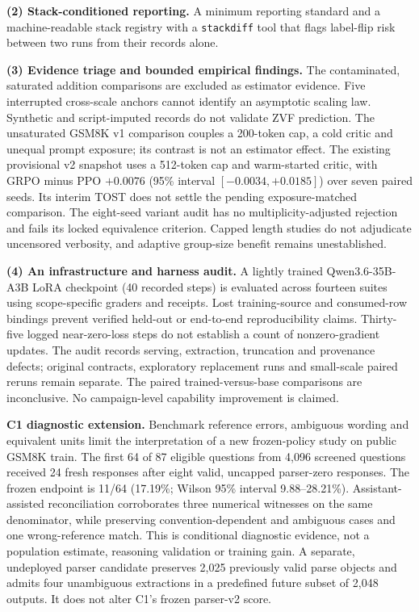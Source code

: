 \documentclass[12pt,a4paper]{report}
\begin{document}
\textbf{(2) Stack-conditioned reporting.} A minimum reporting standard and a
machine-readable stack registry with a \texttt{stackdiff} tool that flags
label-flip risk between two runs from their records alone.

\textbf{(3) Evidence triage and bounded empirical findings.} The contaminated, saturated addition comparisons are excluded as estimator evidence. Five interrupted cross-scale anchors cannot identify an asymptotic scaling law. Synthetic and script-imputed records do not validate ZVF prediction. The unsaturated GSM8K v1 comparison couples a 200-token cap, a cold critic and unequal prompt exposure; its contrast is not an estimator effect. The existing provisional v2 snapshot uses a 512-token cap and warm-started critic, with GRPO minus PPO $+0.0076$ (95\% interval $[-0.0034,+0.0185]$) over seven paired seeds. Its interim TOST does not settle the pending exposure-matched comparison. The eight-seed variant audit has no multiplicity-adjusted rejection and fails its locked equivalence criterion. Capped length studies do not adjudicate uncensored verbosity, and adaptive group-size benefit remains unestablished.

\textbf{(4) An infrastructure and harness audit.} A lightly trained Qwen3.6-35B-A3B LoRA checkpoint (40 recorded steps) is evaluated across fourteen suites using scope-specific graders and receipts. Lost training-source and consumed-row bindings prevent verified held-out or end-to-end reproducibility claims. Thirty-five logged near-zero-loss steps do not establish a count of nonzero-gradient updates. The audit records serving, extraction, truncation and provenance defects; original contracts, exploratory replacement runs and small-scale paired reruns remain separate. The paired trained-versus-base comparisons are inconclusive. No campaign-level capability improvement is claimed.

\textbf{C1 diagnostic extension.} Benchmark reference errors, ambiguous wording and equivalent units limit the interpretation of a new frozen-policy study on public GSM8K train. The first 64 of 87 eligible questions from 4,096 screened questions received 24 fresh responses after eight valid, uncapped parser-zero responses. The frozen endpoint is 11/64 (17.19\%; Wilson 95\% interval 9.88--28.21\%). Assistant-assisted reconciliation corroborates three numerical witnesses on the same denominator, while preserving convention-dependent and ambiguous cases and one wrong-reference match. This is conditional diagnostic evidence, not a population estimate, reasoning validation or training gain. A separate, undeployed parser candidate preserves 2,025 previously valid parse objects and admits four unambiguous extractions in a predefined future subset of 2,048 outputs. It does not alter C1's frozen parser-v2 score.
\end{document}
